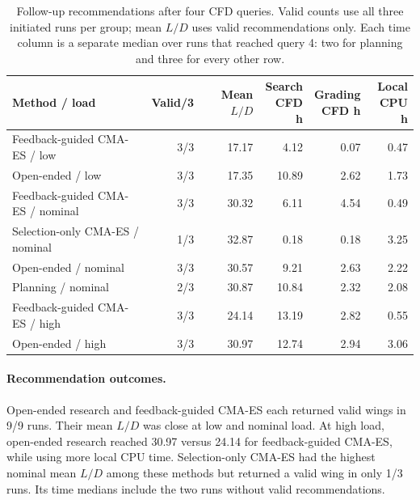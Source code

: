\begin{table}[htbp]
\centering\small
\caption{Follow-up recommendations after four CFD queries. Valid counts use
all three initiated runs per group; mean $L/D$ uses valid recommendations
only. Each time column is a separate median over runs that reached query 4:
two for planning and three for every other row.}
\label{tab:resource-followup}
\setlength{\tabcolsep}{3pt}
\begin{tabular*}{\textwidth}{@{\extracolsep{\fill}}lrrrrr}
\toprule
Method / load & Valid/3 & Mean $L/D$ & \shortstack{Search\\CFD h} &
\shortstack{Grading\\CFD h} & \shortstack{Local\\CPU h} \\
\midrule
Feedback-guided CMA-ES / low & 3/3 & 17.17 & 4.12 & 0.07 & 0.47 \\
Open-ended / low & 3/3 & 17.35 & 10.89 & 2.62 & 1.73 \\
Feedback-guided CMA-ES / nominal & 3/3 & 30.32 & 6.11 & 4.54 & 0.49 \\
Selection-only CMA-ES / nominal & 1/3 & 32.87 & 0.18 & 0.18 & 3.25 \\
Open-ended / nominal & 3/3 & 30.57 & 9.21 & 2.63 & 2.22 \\
Planning / nominal & 2/3 & 30.87 & 10.84 & 2.32 & 2.08 \\
Feedback-guided CMA-ES / high & 3/3 & 24.14 & 13.19 & 2.82 & 0.55 \\
Open-ended / high & 3/3 & 30.97 & 12.74 & 2.94 & 3.06 \\
\bottomrule
\end{tabular*}
\end{table}

\paragraph{Recommendation outcomes.}
Open-ended research and feedback-guided CMA-ES each returned valid wings in
9/9 runs. Their mean $L/D$ was close at low and nominal load. At high load,
open-ended research reached 30.97 versus 24.14 for feedback-guided CMA-ES,
while using more local CPU time. Selection-only CMA-ES had the highest
nominal mean $L/D$ among these methods but returned a valid wing in only
1/3 runs. Its time medians include the two runs without valid recommendations.

